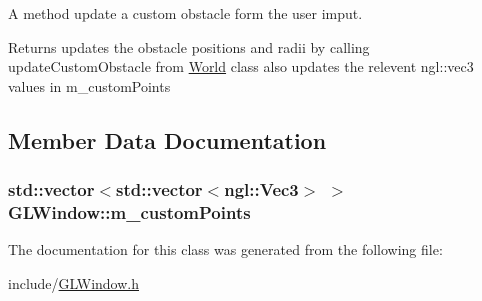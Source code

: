 A method update a custom obstacle form the user imput. \begin{DoxyReturn}{Returns}
updates the obstacle positions and radii by calling updateCustomObstacle from \hyperlink{classWorld}{World} class also updates the relevent ngl::vec3 values in m\_\-customPoints 
\end{DoxyReturn}


\subsection{Member Data Documentation}
\hypertarget{classGLWindow_ab33c3b96320802b33660ebcc16ca302d}{
\subsubsection[{m\_\-customPoints}]{\setlength{\rightskip}{0pt plus 5cm}std::vector$<$std::vector$<$ngl::Vec3$>$ $>$ {\bf GLWindow::m\_\-customPoints}}}
\label{classGLWindow_ab33c3b96320802b33660ebcc16ca302d}


The documentation for this class was generated from the following file:\begin{DoxyCompactItemize}
\item 
include/\hyperlink{GLWindow_8h}{GLWindow.h}\end{DoxyCompactItemize}
